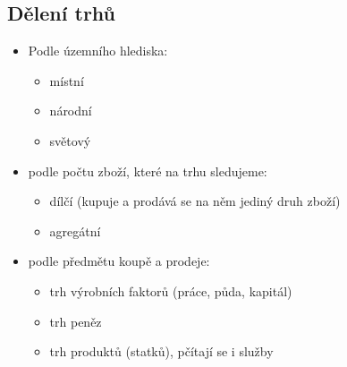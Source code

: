 \subsection{Dělení trhů}
\begin{itemize}
    \item Podle územního hlediska:
    \begin{itemize}
        \item místní
        \item národní
        \item světový
    \end{itemize}
    \item podle počtu zboží, které na trhu sledujeme:
    \begin{itemize}
        \item dílčí (kupuje a prodává se na něm jediný druh zboží)
        \item agregátní
    \end{itemize}
    \item podle předmětu koupě a prodeje:
    \begin{itemize}
        \item trh výrobních faktorů (práce, půda, kapitál)
        \item trh peněz
        \item trh produktů (statků), pčítají se i služby
    \end{itemize}
\end{itemize}